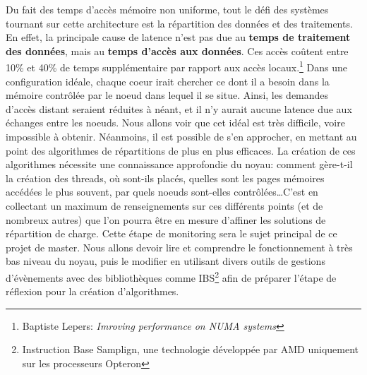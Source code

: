   Du fait des temps d'accès mémoire non uniforme, tout le défi des systèmes
  tournant sur cette architecture est la répartition des données et des
  traitements. En effet, la principale cause de latence n'est pas due au
  \textbf{temps de traitement des données}, mais au \textbf{temps d'accès aux
    données}. Ces accès coûtent entre 10\% et 40\% de temps supplémentaire par
  rapport aux accès locaux.\footnote{Baptiste Lepers: \textit{Imroving
      performance on NUMA systems}} Dans une configuration idéale, chaque coeur
  irait chercher ce dont il a besoin dans la mémoire contrôlée par le noeud dans
  lequel il se situe. Ainsi, les demandes d'accès distant seraient réduites à
  néant, et il n'y aurait aucune latence due aux échanges entre les noeuds. Nous
  allons voir que cet idéal est très difficile, voire impossible à
  obtenir. Néanmoins, il est possible de s'en approcher, en mettant au point des
  algorithmes de répartitions de plus en plus efficaces. La création de ces
  algorithmes nécessite une connaissance approfondie du noyau: comment gère-t-il
  la création des threads, où sont-ils placés, quelles sont les pages mémoires
  accédées le plus souvent, par quels noeuds sont-elles contrôlées\ldots C'est
  en collectant un maximum de renseignements sur ces différents points (et de
  nombreux autres) que l'on pourra être en mesure d'affiner les solutions de
  répartition de charge. Cette étape de monitoring sera le sujet principal de ce
  projet de master. Nous allons devoir lire et comprendre le fonctionnement à
  très bas niveau du noyau, puis le modifier en utilisant divers outils de
  gestions d'évènements avec des bibliothèques comme IBS\footnote{Instruction
    Base Samplign, une technologie développée par AMD uniquement sur les
    processeurs Opteron} afin de préparer l'étape de réflexion pour la création
  d'algorithmes.
